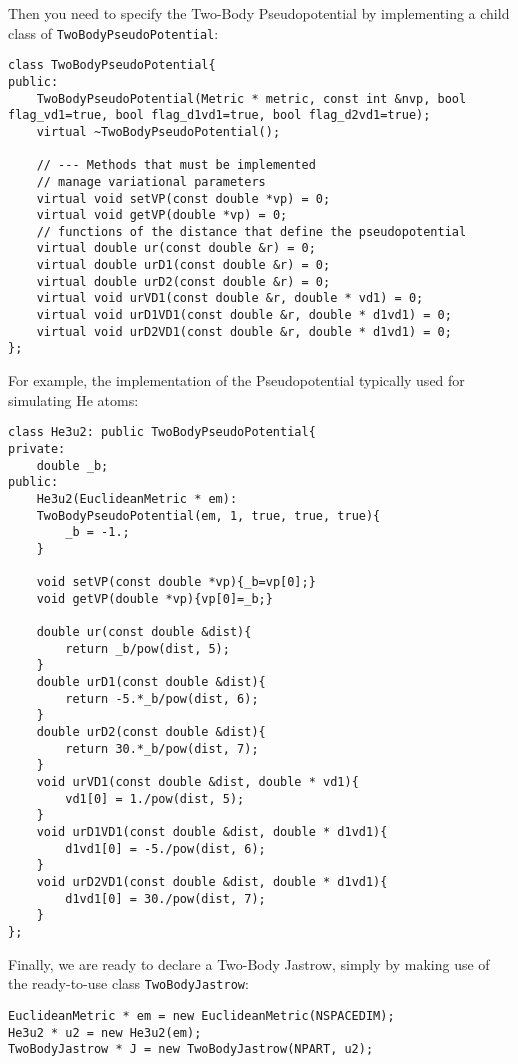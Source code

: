 \documentclass[11pt,a4paper,twoside]{article}
\begin{document}
Then you need to specify the Two-Body Pseudopotential by implementing a child class of \verb+TwoBodyPseudoPotential+:
\begin{lstlisting}
class TwoBodyPseudoPotential{
public:
    TwoBodyPseudoPotential(Metric * metric, const int &nvp, bool flag_vd1=true, bool flag_d1vd1=true, bool flag_d2vd1=true);
    virtual ~TwoBodyPseudoPotential();

    // --- Methods that must be implemented
    // manage variational parameters
    virtual void setVP(const double *vp) = 0;
    virtual void getVP(double *vp) = 0;
    // functions of the distance that define the pseudopotential
    virtual double ur(const double &r) = 0;
    virtual double urD1(const double &r) = 0;
    virtual double urD2(const double &r) = 0;
    virtual void urVD1(const double &r, double * vd1) = 0;
    virtual void urD1VD1(const double &r, double * d1vd1) = 0;
    virtual void urD2VD1(const double &r, double * d1vd1) = 0;
};
\end{lstlisting}
For example, the implementation of the Pseudopotential typically used for simulating $\text{He}$ atoms:
\begin{lstlisting}
class He3u2: public TwoBodyPseudoPotential{
private:
    double _b;
public:
    He3u2(EuclideanMetric * em):
    TwoBodyPseudoPotential(em, 1, true, true, true){
        _b = -1.;
    }

    void setVP(const double *vp){_b=vp[0];}
    void getVP(double *vp){vp[0]=_b;}

    double ur(const double &dist){
        return _b/pow(dist, 5);
    }
    double urD1(const double &dist){
        return -5.*_b/pow(dist, 6);
    }
    double urD2(const double &dist){
        return 30.*_b/pow(dist, 7);
    }
    void urVD1(const double &dist, double * vd1){
        vd1[0] = 1./pow(dist, 5);
    }
    void urD1VD1(const double &dist, double * d1vd1){
        d1vd1[0] = -5./pow(dist, 6);
    }
    void urD2VD1(const double &dist, double * d1vd1){
        d1vd1[0] = 30./pow(dist, 7);
    }
};
\end{lstlisting}

Finally, we are ready to declare a Two-Body Jastrow, simply by making use of the ready-to-use class \verb+TwoBodyJastrow+:
\begin{lstlisting}
EuclideanMetric * em = new EuclideanMetric(NSPACEDIM);
He3u2 * u2 = new He3u2(em);
TwoBodyJastrow * J = new TwoBodyJastrow(NPART, u2);
\end{lstlisting}


\end{document}
